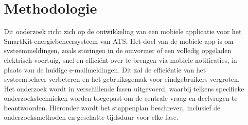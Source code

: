 \section{Methodologie}
\label{sec:methodologie}

Dit onderzoek richt zich op de ontwikkeling van een mobiele applicatie voor het SmartKit-energiebeheersysteem van ATS. Het doel van de mobiele app is om systeemmeldingen, zoals storingen in de omvormer of een volledig opgeladen elektrisch voertuig, snel en efficiënt over te brengen via mobiele notificaties, in plaats van de huidige e-mailmeldingen. Dit zal de efficiëntie van het systeembeheer verbeteren en het gebruiksgemak voor eindgebruikers vergroten. Het onderzoek wordt in verschillende fasen uitgevoerd, waarbij telkens specifieke onderzoekstechnieken worden toegepast om de centrale vraag en deelvragen te beantwoorden. Hieronder wordt het stappenplan beschreven, inclusief de onderzoeksmethoden en geschatte tijdsduur voor elke fase.


